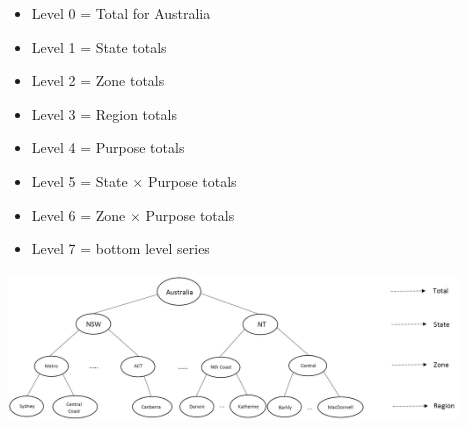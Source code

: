 \documentclass[11pt,a4paper,]{article}
\providecommand{\tightlist}{%
  \setlength{\itemsep}{0pt}\setlength{\parskip}{0pt}}
\let\origfigure\figure
\let\endorigfigure\endfigure
\renewenvironment{figure}[1][2] {
    \expandafter\origfigure\expandafter[htbp]
} {
    \endorigfigure
}
\begin{document}
\begin{itemize}
\tightlist
\item
  Level 0 = Total for Australia
\item
  Level 1 = State totals
\item
  Level 2 = Zone totals
\item
  Level 3 = Region totals
\item
  Level 4 = Purpose totals
\item
  Level 5 = State \(\times\) Purpose totals
\item
  Level 6 = Zone \(\times\) Purpose totals
\item
  Level 7 = bottom level series
\end{itemize}

\begin{figure}

{\centering \includegraphics[width=450px,height=150px]{Paper-Figures/Australian_hierarchy_structure} 

}

\caption{Australia geographic hierarchy structure}\label{fig:Australiahierarchystructure}
\end{figure}
\end{document}
